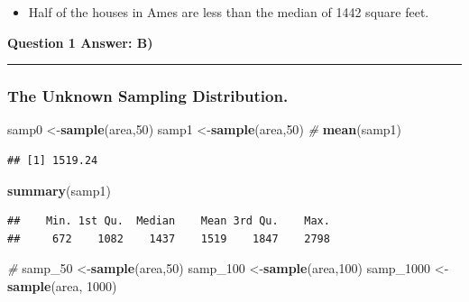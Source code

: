 \documentclass[]{article}
\newenvironment{Shaded}{\begin{snugshade}}{\end{snugshade}}
\newcommand{\KeywordTok}[1]{\textcolor[rgb]{0.13,0.29,0.53}{\textbf{{#1}}}}
\newcommand{\DecValTok}[1]{\textcolor[rgb]{0.00,0.00,0.81}{{#1}}}
\newcommand{\CommentTok}[1]{\textcolor[rgb]{0.56,0.35,0.01}{\textit{{#1}}}}
\newcommand{\NormalTok}[1]{{#1}}
\begin{document}
\begin{itemize}
\itemsep1pt\parskip0pt
\item
  Half of the houses in Ames are less than the median of 1442 square
  feet.
\end{itemize}

\textbf{Question 1 Answer: B)}

\begin{center}\rule{0.5\linewidth}{\linethickness}\end{center}

\subsubsection{The Unknown Sampling
Distribution.}\label{the-unknown-sampling-distribution.}

\begin{Shaded}
\begin{Highlighting}[]
\NormalTok{samp0 <-}\KeywordTok{sample}\NormalTok{(area,}\DecValTok{50}\NormalTok{)}
\NormalTok{samp1 <-}\KeywordTok{sample}\NormalTok{(area,}\DecValTok{50}\NormalTok{)}
\CommentTok{#}
\KeywordTok{mean}\NormalTok{(samp1)}
\end{Highlighting}
\end{Shaded}

\begin{verbatim}
## [1] 1519.24
\end{verbatim}

\begin{Shaded}
\begin{Highlighting}[]
\KeywordTok{summary}\NormalTok{(samp1)}
\end{Highlighting}
\end{Shaded}

\begin{verbatim}
##    Min. 1st Qu.  Median    Mean 3rd Qu.    Max. 
##     672    1082    1437    1519    1847    2798
\end{verbatim}

\begin{Shaded}
\begin{Highlighting}[]
\CommentTok{#}
\NormalTok{samp_50 <-}\KeywordTok{sample}\NormalTok{(area,}\DecValTok{50}\NormalTok{)}
\NormalTok{samp_100 <-}\KeywordTok{sample}\NormalTok{(area,}\DecValTok{100}\NormalTok{)}
\NormalTok{samp_1000 <-}\KeywordTok{sample}\NormalTok{(area, }\DecValTok{1000}\NormalTok{)}
\end{Highlighting}
\end{Shaded}
\end{document}
